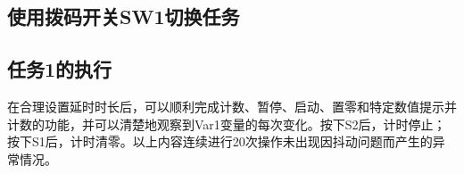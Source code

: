 \documentclass[12pt]{article}
\begin{document}
\subsection{使用拨码开关SW1切换任务}
\begin{figure}[htbp]
	\centering
	
\end{figure}

\subsection{任务1的执行}

\begin{figure}[htbp]
	\centering
	
\end{figure}

在合理设置延时时长后，可以顺利完成计数、暂停、启动、置零和特定数值提示并计数的功能，并可以清楚地观察到Var1变量的每次变化。按下S2后，计时停止；按下S1后，计时清零。以上内容连续进行20次操作未出现因抖动问题而产生的异常情况。
\end{document}
